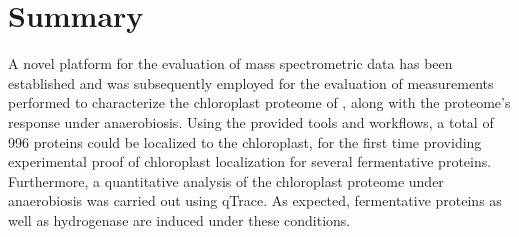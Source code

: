 \cleardoublepage
\chapter{Summary}

A novel platform for the evaluation of mass spectrometric data has been
established and was subsequently employed for the evaluation of measurements
performed to characterize the chloroplast proteome of \cre, along with
the proteome's response under anaerobiosis.
Using the provided tools and workflows, a total of 996 proteins could be 
localized to the chloroplast, for the first time providing experimental proof 
of chloroplast localization for several fermentative proteins.
Furthermore, a quantitative analysis of the chloroplast proteome under 
anaerobiosis was carried out using qTrace.
As expected, fermentative proteins as well as hydrogenase are induced under
these conditions.
